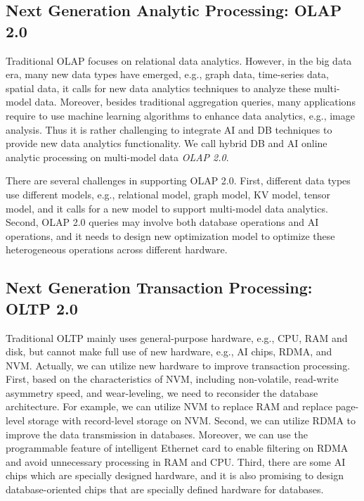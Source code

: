\subsection{Next Generation Analytic Processing: OLAP 2.0}

Traditional OLAP focuses on relational data analytics. However, in the big data era, many new data types have emerged, e.g., graph data, time-series data, spatial data, it calls for new data analytics techniques to analyze these multi-model data. Moreover, besides traditional aggregation queries, many applications require to use machine learning algorithms to enhance data analytics, e.g., image analysis. Thus it is rather  challenging to integrate AI and DB techniques to provide new data analytics functionality. We call hybrid DB and AI online analytic processing on multi-model data {\it OLAP 2.0}.

There are several challenges in supporting OLAP 2.0. First, different data types use different models, e.g., relational model, graph model, KV model, tensor model, and it calls for a new model to support multi-model data analytics. Second, OLAP 2.0 queries may involve both database operations and AI operations, and it needs to design new optimization model to optimize these heterogeneous operations across different hardware. 



\subsection{Next Generation Transaction Processing: OLTP 2.0}

Traditional OLTP mainly uses general-purpose hardware, e.g., CPU, RAM and disk, 
but cannot make full use of new hardware, e.g., AI chips, RDMA, and NVM. Actually, we can utilize new hardware to improve transaction processing. First, based on the characteristics of NVM, including non-volatile, read-write asymmetry speed, and wear-leveling, we need to reconsider the database architecture. For example, we can utilize NVM to replace RAM and replace page-level storage with record-level storage on NVM. Second, we can utilize RDMA to improve the data transmission in databases. Moreover, we can use the programmable feature of  intelligent Ethernet card to enable filtering on RDMA and avoid unnecessary processing in RAM and CPU. Third, there are some AI chips which are specially designed hardware, and it is also promising to design database-oriented chips that are specially defined hardware for databases. 


